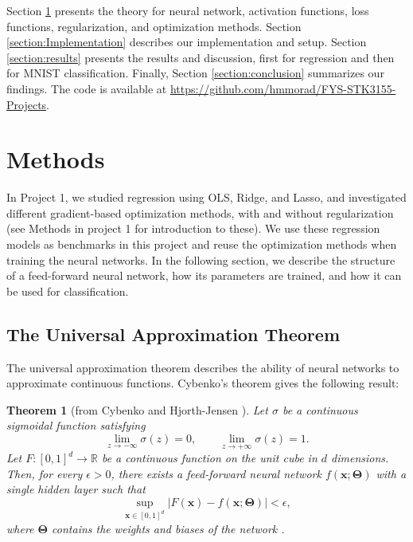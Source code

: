 \documentclass[amssymb,secnumarabic,twocolumn,aps]{revtex4}
\newtheorem*{theorem}{Theorem}
\begin{document}
Section \ref{section:methods} presents the theory for neural network, activation functions, loss functions, regularization, and optimization methods. Section \ref{section:Implementation} describes our implementation and setup. Section \ref{section:results} presents the results and discussion, first for regression and then for MNIST classification. Finally, Section \ref{section:conclusion} summarizes our findings. The code is available at \url{https://github.com/hmmorad/FYS-STK3155-Projects}.


\section{Methods}\label{section:methods}

In Project 1, we studied regression using OLS, Ridge, and Lasso, and investigated different gradient-based optimization methods, with and without regularization (see Methods in project 1 \cite{project1} for introduction to these). We use these regression models as benchmarks in this project and reuse the optimization methods when training the neural networks. In the following section, we describe the structure of a feed-forward neural network, how its parameters are trained, and how it can be used for classification.

\subsection{The Universal Approximation Theorem}

The universal approximation theorem describes the ability of neural networks to approximate continuous functions. Cybenko's theorem gives the following result:
\begin{theorem}[from Cybenko \cite{cybenko1989} and Hjorth-Jensen \cite{lecturebook}]
    Let $\sigma$ be a continuous sigmoidal function satisfying
    \begin{equation*}
        \lim_{z\to-\infty}\sigma(z)=0,
        \qquad
        \lim_{z\to+\infty}\sigma(z)=1.
    \end{equation*}
    Let $F:[0,1]^d\rightarrow\mathbb{R}$ be a continuous function on the unit cube in $d$ dimensions. Then, for every $\epsilon>0$, there exists a feed-forward neural network $f(\boldsymbol{x};\boldsymbol{\Theta})$ with a single hidden layer such that
    \begin{equation*}
        \sup_{\boldsymbol{x}\in[0,1]^d}
        \left|F(\boldsymbol{x})-
        f(\boldsymbol{x};\boldsymbol{\Theta})\right|
        <\epsilon,
    \end{equation*}
    where $\boldsymbol{\Theta}$ contains the weights and biases of the network \cite{lecturebook}.
\end{theorem}
\end{document}
